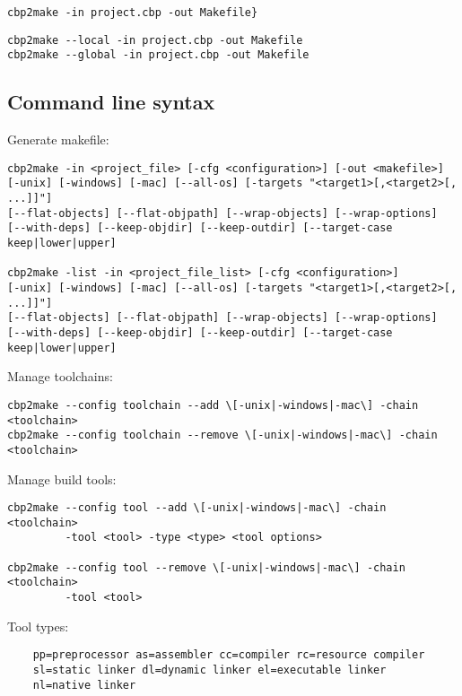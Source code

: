 
\begin{lstlisting}
cbp2make -in project.cbp -out Makefile}
\end{lstlisting}


\begin{lstlisting}
cbp2make --local -in project.cbp -out Makefile
cbp2make --global -in project.cbp -out Makefile
\end{lstlisting}

\subsection{Command line syntax}

Generate makefile:
\begin{verbatim}
cbp2make -in <project_file> [-cfg <configuration>] [-out <makefile>]
[-unix] [-windows] [-mac] [--all-os] [-targets "<target1>[,<target2>[, ...]]"]
[--flat-objects] [--flat-objpath] [--wrap-objects] [--wrap-options]
[--with-deps] [--keep-objdir] [--keep-outdir] [--target-case keep|lower|upper]

cbp2make -list -in <project_file_list> [-cfg <configuration>]
[-unix] [-windows] [-mac] [--all-os] [-targets "<target1>[,<target2>[, ...]]"]
[--flat-objects] [--flat-objpath] [--wrap-objects] [--wrap-options]
[--with-deps] [--keep-objdir] [--keep-outdir] [--target-case keep|lower|upper]
\end{verbatim}

Manage toolchains:
\begin{verbatim}
cbp2make --config toolchain --add \[-unix|-windows|-mac\] -chain <toolchain>
cbp2make --config toolchain --remove \[-unix|-windows|-mac\] -chain <toolchain>
\end{verbatim}

Manage build tools:
\begin{verbatim}
cbp2make --config tool --add \[-unix|-windows|-mac\] -chain <toolchain>
         -tool <tool> -type <type> <tool options>
         
cbp2make --config tool --remove \[-unix|-windows|-mac\] -chain <toolchain>
         -tool <tool>
\end{verbatim}

Tool types:      
\begin{verbatim}
    pp=preprocessor as=assembler cc=compiler rc=resource compiler
    sl=static linker dl=dynamic linker el=executable linker
    nl=native linker
\end{verbatim}

